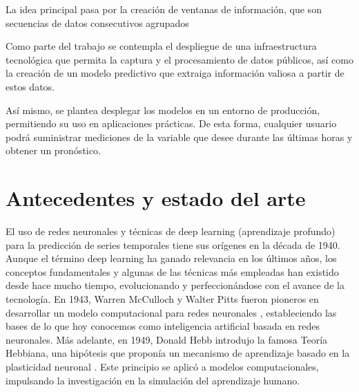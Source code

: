 La idea principal pasa por la creación de ventanas de información, que son secuencias de datos consecutivos agrupados 

Como parte del trabajo se contempla el despliegue de una infraestructura tecnológica que permita la captura y el procesamiento de datos públicos,
 así como la creación de un modelo predictivo que extraiga información valiosa a partir de estos datos.    

Así mismo, se plantea desplegar los modelos en un entorno de producción, permitiendo su uso en aplicaciones prácticas. 
De esta forma, cualquier usuario podrá suministrar mediciones de la variable que desee durante las últimas horas y obtener un pronóstico.

\section{Antecedentes y estado del arte}

El uso de redes neuronales y técnicas de deep learning (aprendizaje profundo) para la predicción de series temporales tiene sus orígenes en la década de 1940. Aunque el término deep learning ha ganado relevancia en los últimos años, los conceptos fundamentales y algunas de las técnicas más empleadas han existido desde hace mucho tiempo, evolucionando y perfeccionándose con el avance de la tecnología.
En 1943, Warren McCulloch y Walter Pitts fueron pioneros en desarrollar un modelo computacional para redes neuronales \cite{mcculloch1943}, 
estableciendo las bases de lo que hoy conocemos como inteligencia artificial basada en redes neuronales. 
Más adelante, en 1949, Donald Hebb introdujo la famosa Teoría Hebbiana, una hipótesis que proponía un mecanismo de aprendizaje basado en la plasticidad neuronal \cite{hebb1949}. 
Este principio se aplicó a modelos computacionales, impulsando la investigación en la simulación del aprendizaje humano.


